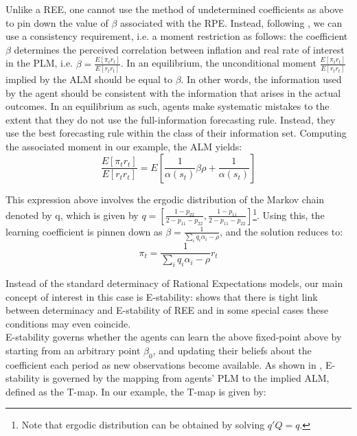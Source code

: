 \documentclass[12pt,reqno]{article}
\numberwithin{equation}{section}
\begin{document}
\noindent
Unlike a REE, one cannot use the method of undetermined coefficients as above to pin down the value of $\beta$ associated with the RPE. Instead, following \cite{hommes2014behavioral}, we can use a consistency requirement, i.e. a moment restriction as follows: the coefficient $\beta$ determines the {perceived correlation} between inflation and real rate of interest in the PLM, i.e.   $\beta=\frac{E [\pi_t r_t]}{E[r_t r_t]} $. In an equilibrium, the unconditional moment $\frac{E [\pi_t r_t]}{E[r_t r_t]} $ implied by the ALM should be equal to $\beta$. In other words, the information used by the agent should be consistent with the information that arises in the actual outcomes. In an equilibrium as such, agents make systematic mistakes to the extent that they do not use the full-information forecasting rule. Instead, they use the best forecasting rule within the class of their information set.  Computing the associated moment in our example, the ALM yields: \\ 

$$\frac{ E[\pi_t r_t]}{E[r_t r_t]} = E[ \frac{1}{\alpha(s_t)} \beta \rho + \frac{1}{\alpha(s_t)}]$$

This expression above involves the ergodic distribution of the Markov chain denoted by q, which is given by  $ q= [ \frac{1-p_{22}}{2-p_{11}- p_{22}}, \frac{1-p_{11}}{2-p_{11}-p_{22}}] $\footnote{Note that ergodic distribution can be obtained by solving $ q' Q = q $.}. Using this, the learning coefficient is pinnen down as $ \beta = \frac{1}{\sum_i q_i \alpha_i  -\rho } $, and the solution reduces to: \\

$$ \pi_t = \frac{1}{\sum_i q_i \alpha_i  -\rho} r_t $$

\noindent
Instead of the standard determinacy of Rational Expectations models, our main concept of interest in this case is E-stability: \cite{bullard2014does} shows that there is tight link between determinacy and E-stability of REE and in some special cases these conditions may even coincide. \\

\noindent
E-stability governs whether the agents can learn the above fixed-point above by starting from an arbitrary point $\beta_0$, and updating their beliefs about the coefficient each period as new observations become available. As shown in \cite{evans2012learning}, E-stability is governed by the mapping from agents' PLM to the implied ALM, defined as the T-map. In our example, the T-map is given by: \\
\end{document}
